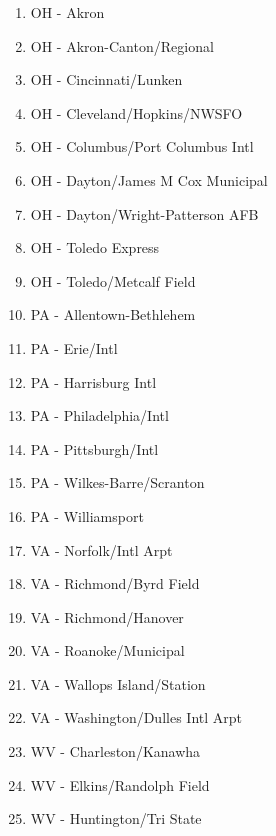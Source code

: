 \begin{multicols}{2}
{\begin{enumerate}
    \item OH - Akron
    \item OH - Akron-Canton/Regional
    \item OH - Cincinnati/Lunken
    \item OH - Cleveland/Hopkins/NWSFO
    \item OH - Columbus/Port Columbus Intl
    \item OH - Dayton/James M Cox Municipal
    \item OH - Dayton/Wright-Patterson AFB
    \item OH - Toledo Express
    \item OH - Toledo/Metcalf Field
    \item PA - Allentown-Bethlehem
    \item PA - Erie/Intl
    \item PA - Harrisburg Intl
    \item PA - Philadelphia/Intl
    \item PA - Pittsburgh/Intl
    \item PA - Wilkes-Barre/Scranton
    \item PA - Williamsport
    \item VA - Norfolk/Intl Arpt
    \item VA - Richmond/Byrd Field
    \item VA - Richmond/Hanover
    \item VA - Roanoke/Municipal
    \item VA - Wallops Island/Station
    \item VA - Washington/Dulles Intl Arpt
    \item WV - Charleston/Kanawha
    \item WV - Elkins/Randolph Field
    \item WV - Huntington/Tri State
\end{enumerate}
}
\end{multicols}
